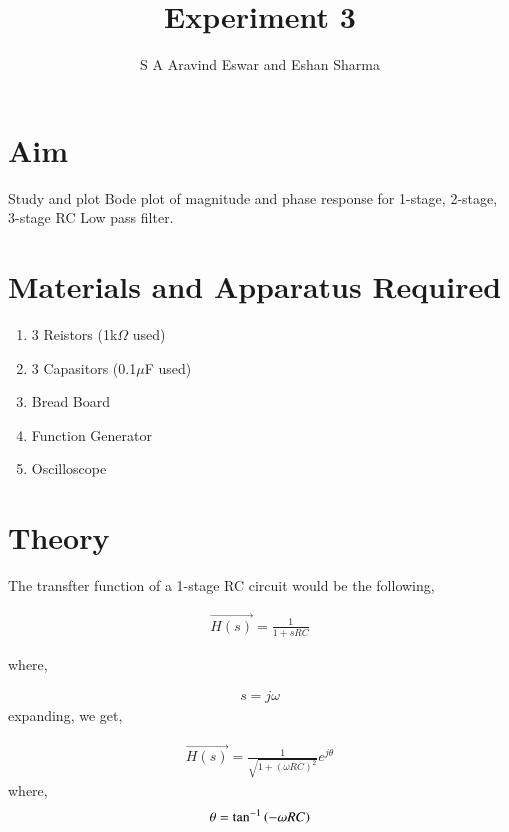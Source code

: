 \documentclass[journal]{IEEEtran}
\begin{document}

\vspace{3cm}

\title{Experiment 3} 
\author{S A Aravind Eswar and Eshan Sharma}
{\let\newpage\relax\maketitle}

\section{Aim}

Study and plot Bode plot of magnitude and phase response for 1-stage, 2-stage, 3-stage RC Low pass filter.

\section{Materials and Apparatus Required}

\begin{enumerate}
    \item 3 Reistors (1k$\Omega$ used)
    \item 3 Capasitors (0.1$\mu$F used)
    \item Bread Board
    \item Function Generator
    \item Oscilloscope
\end{enumerate}

\section{Theory}

The transfter function of a 1-stage RC circuit would be the following,

\begin{align*}
    \vec{H(s)} = \frac{1}{1+sRC}
\end{align*}

where,

\begin{align*}
    s = j\omega
\end{align*}
expanding, we get,

\begin{align*}
    \vec{H(s)} = \frac{1}{\sqrt{1+(\omega RC)^2}} e^{j\theta}
\end{align*}
where,
\begin{align*}
    \theta = \tan^{-1}\left(-\omega RC\right)
\end{align*}
\end{document}
